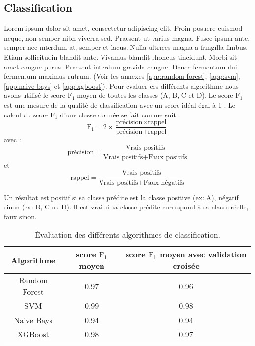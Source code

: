 \subsection{Classification}
Lorem ipsum dolor sit amet, consectetur adipiscing elit. Proin posuere euismod neque, non semper nibh viverra sed. Praesent ut varius magna. Fusce ipsum ante, semper nec interdum at, semper et lacus. Nulla ultrices magna a fringilla finibus. Etiam sollicitudin blandit ante. Vivamus blandit rhoncus tincidunt. Morbi sit amet congue purus. Praesent interdum gravida congue. Donec fermentum dui fermentum maximus rutrum. (Voir les annexes \ref{app:random-forest}, \ref{app:svm}, \ref{app:naive-bays} et \ref{app:xgboost}). Pour évaluer ces différents algorithme nous avons utilisé le score $\text{F}_1$ moyen de toutes les classes (A, B, C et D). Le score $\text{F}_1$ est une mesure de la qualité de classification avec un score idéal égal à 1 . Le calcul du score $\text{F}_1$ d'une classe donnée se fait comme suit :
\begin{equation*}
    \text{F}_1 = 2 × \frac{\text{précision} ×  \text{rappel}}{\text{précision}+\text{rappel}}
\end{equation*}
avec :
\begin{equation*}
    \text{précision} = \frac{\text{Vrais positifs}}{\text{Vrais positifs}+\text{Faux positifs}}
\end{equation*}
et 
\begin{equation*}
    \text{rappel} = \frac{\text{Vrais positifs}}{\text{Vrais positifs}+\text{Faux négatifs}}
\end{equation*}

Un résultat est positif si sa classe prédite est la classe positive (ex: A), négatif sinon (ex: B, C ou D). Il est vrai si sa classe prédite correspond à sa classe réelle, faux sinon.


\begin{table}[h!]
    \centering
    \begin{tabular}{|c|c|c|}
        \hline
        Algorithme & score $\text{F}_1$ moyen  & score $\text{F}_1$ moyen avec validation croisée \\
        \hline
         Random Forest & 0.97 &  0.96 \\
        \hline
         SVM & 0.99 & 0.98 \\
        \hline
        Naive Bays & 0.94 &  0.94 \\
        \hline
        XGBoost & 0.98 &  0.97\\
        \hline
    \end{tabular}
    \caption{Évaluation des différents algorithmes de classification.}
    \label{tab:f1-scores}
\end{table}
\FloatBarrier


